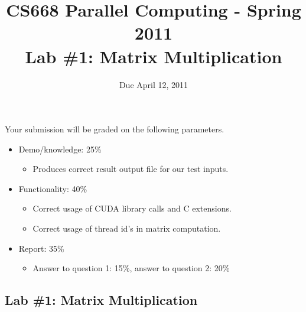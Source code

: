 \documentclass[12pt]{article}
\title{ CS668 Parallel Computing - Spring 2011 \\ Lab \#1: Matrix Multiplication}
\author{\MyFullName}
\date{Due April 12, 2011}
\begin{document}
\maketitle
\thispagestyle{empty}

Your submission will be graded on the following parameters.
\begin{itemize}
\item Demo/knowledge: 25\%
\begin{itemize}
\item Produces correct result output file for our test inputs.
\end{itemize}
\item Functionality:  40\%
\begin{itemize}
\item Correct usage of CUDA library calls and C extensions.
\item Correct usage of thread id's in matrix computation.
\end{itemize}
\item Report: 35\%
\begin{itemize}
\item Answer to question 1: 15\%, answer to question 2: 20\%
\end{itemize}
\end{itemize}

\setcounter{page}{0}
\newpage

\subsection*{Lab \#1: Matrix Multiplication}
\end{document}
